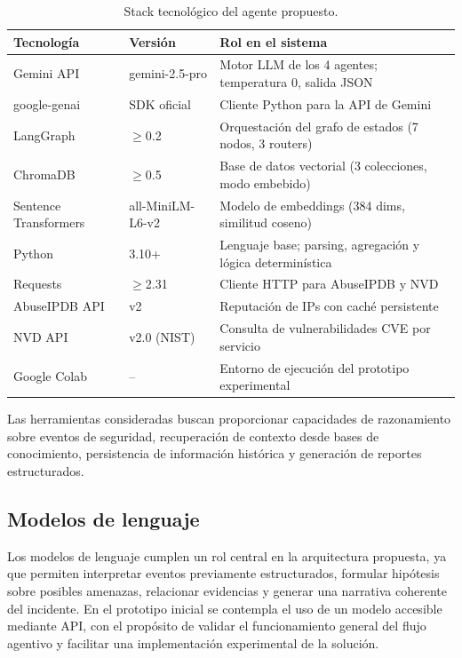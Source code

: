 \begin{table}[H]
\centering
\caption{Stack tecnológico del agente propuesto.}
\label{tab:stack_tecnologico}
\renewcommand{\arraystretch}{1.3}
\begin{tabularx}{\textwidth}{p{3.2cm} p{2.2cm} X}
\toprule
\textbf{Tecnología} & \textbf{Versión} &
\textbf{Rol en el sistema} \\
\midrule
Gemini API          & gemini-2.5-pro & Motor LLM de los 4 agentes; temperatura 0, salida JSON \\
google-genai        & SDK oficial           & Cliente Python para la API de Gemini \\
LangGraph           & $\geq$0.2             & Orquestación del grafo de estados (7 nodos, 3 routers) \\
ChromaDB            & $\geq$0.5             & Base de datos vectorial (3 colecciones, modo embebido) \\
Sentence Transformers & all-MiniLM-L6-v2   & Modelo de embeddings (384 dims, similitud coseno) \\
Python              & 3.10+                 & Lenguaje base; parsing, agregación y lógica determinística \\
Requests            & $\geq$2.31            & Cliente HTTP para AbuseIPDB y NVD \\
AbuseIPDB API       & v2                    & Reputación de IPs con caché persistente \\
NVD API             & v2.0 (NIST)           & Consulta de vulnerabilidades CVE por servicio \\
Google Colab        & --                    & Entorno de ejecución del prototipo experimental \\
\bottomrule
\end{tabularx}
\end{table}

Las herramientas consideradas buscan proporcionar capacidades de razonamiento sobre eventos de seguridad, recuperación de contexto desde bases de conocimiento, persistencia de información histórica y generación de reportes estructurados. 

\subsection{Modelos de lenguaje}

Los modelos de lenguaje cumplen un rol central en la arquitectura propuesta, ya que permiten interpretar eventos previamente estructurados, formular hipótesis sobre posibles amenazas, relacionar evidencias y generar una narrativa coherente del incidente. En el prototipo inicial se contempla el uso de un modelo accesible mediante API, con el propósito de validar el funcionamiento general del flujo agentivo y facilitar una implementación experimental de la solución.

